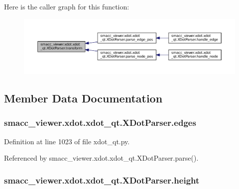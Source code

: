 Here is the caller graph for this function\+:
\nopagebreak
\begin{figure}[H]
\begin{center}
\leavevmode
\includegraphics[width=350pt]{classsmacc__viewer_1_1xdot_1_1xdot__qt_1_1XDotParser_ab136f7aaca27f3d01f24c816a276b929_icgraph}
\end{center}
\end{figure}




\subsection{Member Data Documentation}
\subsubsection[{\texorpdfstring{edges}{edges}}]{\setlength{\rightskip}{0pt plus 5cm}smacc\+\_\+viewer.\+xdot.\+xdot\+\_\+qt.\+X\+Dot\+Parser.\+edges}\hypertarget{classsmacc__viewer_1_1xdot_1_1xdot__qt_1_1XDotParser_ace12c72e79acec94a77b786af0464e14}{}\label{classsmacc__viewer_1_1xdot_1_1xdot__qt_1_1XDotParser_ace12c72e79acec94a77b786af0464e14}


Definition at line 1023 of file xdot\+\_\+qt.\+py.



Referenced by smacc\+\_\+viewer.\+xdot.\+xdot\+\_\+qt.\+X\+Dot\+Parser.\+parse().

\subsubsection[{\texorpdfstring{height}{height}}]{\setlength{\rightskip}{0pt plus 5cm}smacc\+\_\+viewer.\+xdot.\+xdot\+\_\+qt.\+X\+Dot\+Parser.\+height}\hypertarget{classsmacc__viewer_1_1xdot_1_1xdot__qt_1_1XDotParser_a929356fa5526a2221034303b5891aca8}{}\label{classsmacc__viewer_1_1xdot_1_1xdot__qt_1_1XDotParser_a929356fa5526a2221034303b5891aca8}


